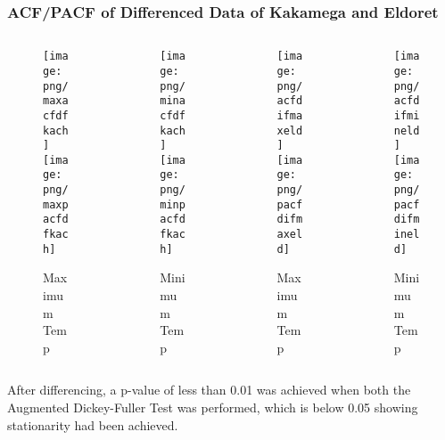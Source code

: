 \documentclass[]{beamer}
\begin{document}
\begin{frame}
\frametitle{ACF/PACF of Differenced Data of Kakamega and Eldoret}	
\fontsize{8pt}{7.2}\selectfont
\begin{columns}
	\begin{column}[c]{3cm}
		\begin{figure}
			\texttt{[image: png/maxacfdfkach]}
			\texttt{[image: png/maxpacfdfkach]}
			\caption{Maximum Temp}
		\end{figure}
	\end{column}
	\begin{column}[c]{3cm}
		\begin{figure}
			\texttt{[image: png/minacfdfkach]}
			\texttt{[image: png/minpacfdfkach]}
			\caption{Minimum Temp}
		\end{figure}
	\end{column}
	\begin{column}[c]{3cm}
		\begin{figure}
			\texttt{[image: png/acfdifmaxeld]}
			\texttt{[image: png/pacfdifmaxeld]}
			\caption{Maximum Temp}
		\end{figure}
	\end{column}
	\begin{column}[c]{3cm}
		\begin{figure}
			\texttt{[image: png/acfdifmineld]}
			\texttt{[image: png/pacfdifmineld]}
			\caption{Minimum Temp}
		\end{figure}
	\end{column}
\end{columns}
\fontsize{8pt}{7.2}\selectfont
After differencing, a p-value of less than 0.01 was achieved when both the Augmented Dickey-Fuller Test was performed, which is below 0.05 showing stationarity had been achieved.
\end{frame}
\end{document}
